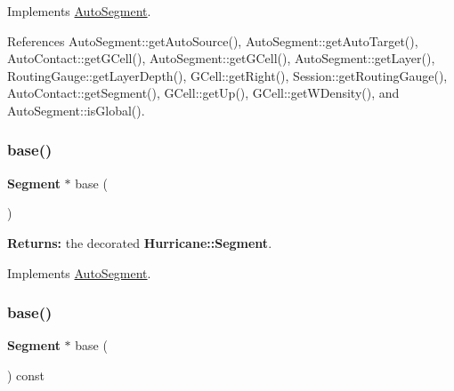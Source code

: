 Implements \hyperlink{classKatabatic_1_1AutoSegment_a096deb8a143f098eac2bff9ab9c52243}{Auto\+Segment}.



References Auto\+Segment\+::get\+Auto\+Source(), Auto\+Segment\+::get\+Auto\+Target(), Auto\+Contact\+::get\+G\+Cell(), Auto\+Segment\+::get\+G\+Cell(), Auto\+Segment\+::get\+Layer(), Routing\+Gauge\+::get\+Layer\+Depth(), G\+Cell\+::get\+Right(), Session\+::get\+Routing\+Gauge(), Auto\+Contact\+::get\+Segment(), G\+Cell\+::get\+Up(), G\+Cell\+::get\+W\+Density(), and Auto\+Segment\+::is\+Global().

\mbox{\label{classKatabatic_1_1AutoHorizontal_a9e651c17b47f82166a02865c9296a2df}} 
\subsubsection{\texorpdfstring{base()}{base()}\hspace{0.1cm}{\footnotesize\ttfamily [1/2]}}
{\footnotesize\ttfamily \textbf{ Segment} $\ast$ base (\begin{DoxyParamCaption}{ }\end{DoxyParamCaption})\hspace{0.3cm}{\ttfamily [virtual]}}

{\bfseries Returns\+:} the decorated \textbf{ Hurricane\+::\+Segment}. 

Implements \hyperlink{classKatabatic_1_1AutoSegment_ade416d0483aefe986988fa89a7cf6fcf}{Auto\+Segment}.

\mbox{\label{classKatabatic_1_1AutoHorizontal_a6f14a3faa93f2c610ea0d2cc7d903706}} 
\subsubsection{\texorpdfstring{base()}{base()}\hspace{0.1cm}{\footnotesize\ttfamily [2/2]}}
{\footnotesize\ttfamily \textbf{ Segment} $\ast$ base (\begin{DoxyParamCaption}{ }\end{DoxyParamCaption}) const\hspace{0.3cm}{\ttfamily [virtual]}}

